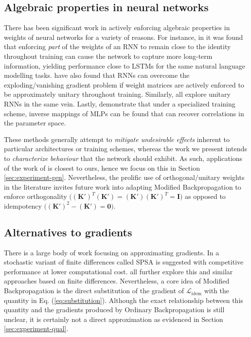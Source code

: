 \documentclass{article}
\theoremstyle{plain}
\theoremstyle{definition}
\theoremstyle{remark}
\newcommand{\vI}{\mathbf{I}}
\newcommand{\vK}{\mathbf{K}}
\begin{document}

\subsection{Algebraic properties in neural networks}
There has been significant work in actively enforcing algebraic properties in weights of neural networks for a variety of reasons. For instance, in \citealt{mikolov-rnn,le-rnn-relu} it was found that enforcing \textit{part} of the weights of an RNN to remain close to the identity throughout training can cause the network to capture more long-term information, yielding performance close to LSTMs for the same natural language modelling tasks. \citealt{arjovsky-rnn} have also found that RNNs can overcome the exploding/vanishing gradient problem if weight matrices are actively enforced to be approximately unitary throughout training. Similarly, \citealt{saxe-isometry,kiani-projunn,jing-tunable-unn} all explore unitary RNNs in the same vein. Lastly, \citealt{ardizzone-inv} demonstrate that under a specialized training scheme, inverse mappings of MLPs can be found that can recover correlations in the parameter space.

These methods generally attempt to \textit{mitigate undesirable effects} inherent to particular architectures or training schemes, whereas the work we present intends to \textit{characterize behaviour} that the network should exhibit. As such, applications of the work of \citealt{shocher-ign} is closest to ours, hence we focus on this in Section \ref{sec:experiment-gen}. Nevertheless, the prolific use of orthogonal/unitary weights in the literature invites future work into adapting Modified Backpropagation to enforce orthogonality ${\big((\vK')^T(\vK')=(\vK')(\vK')^T=\vI\big)}$ as opposed to idempotency ${\big((\vK')^2 - (\vK') = \bm{0}\big)}$.


\subsection{Alternatives to gradients}
There is a large body of work focusing on approximating gradients. In \citealt{spall-perturb} a stochastic variant of finite differences called SPSA is suggested with competitive performance at lower computational cost. \citealt{scheinberg-approx,do-approx,bandler-approx} all further explore this and similar approaches based on finite differences. Nevertheless, a core idea of Modified Backpropagation is the direct substitution of the gradient of $\mathcal{L}_{\mathrm{idem}}$ with the quantity in Eq. (\ref{eq:substitution}). Although the exact relationship between this quantity and the gradients produced by Ordinary Backpropagation is still unclear, it is certainly not a direct approximation as evidenced in Section \ref{sec:experiment-qual}.
\end{document}
